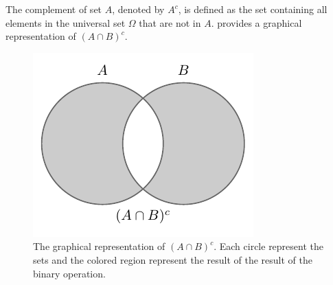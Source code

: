 \begin{definition}[Complementation]
	The complement of set $A$, denoted by $A^c$, is defined as the set containing all elements in the universal set $\Omega$ that are not in $A$.  provides a graphical representation of $(A \cap B)^c$.
	\begin{figure}[H]
		\centering
		\includegraphics[]{figures/set_complementary.pdf}
		\caption{The graphical representation of $(A \cap B)^c$. Each circle represent the sets and the colored region represent the result of the result of the binary operation.}
		\label{fig:set_complementation}
	\end{figure}
\end{definition}


